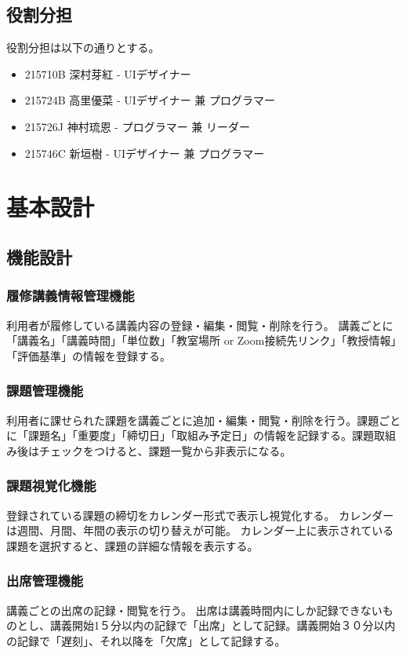 \documentclass[a4paper, 11pt, titlepage]{jsarticle}
\begin{document}
\subsection{役割分担}
役割分担は以下の通りとする。
\begin{itemize}
\item 215710B 深村芽紅 - UIデザイナー
\item 215724B 高里優菜 - UIデザイナー 兼 プログラマー
\item 215726J 神村琉恩 - プログラマー 兼 リーダー
\item 215746C 新垣樹 - UIデザイナー 兼 プログラマー
\end{itemize}

\clearpage

\section{基本設計}
\subsection{機能設計}
\subsubsection{履修講義情報管理機能}
利用者が履修している講義内容の登録・編集・閲覧・削除を行う。
講義ごとに「講義名」「講義時間」「単位数」「教室場所 or Zoom接続先リンク」「教授情報」「評価基準」の情報を登録する。
\subsubsection{課題管理機能}
利用者に課せられた課題を講義ごとに追加・編集・閲覧・削除を行う。課題ごとに「課題名」「重要度」「締切日」「取組み予定日」の情報を記録する。課題取組み後はチェックをつけると、課題一覧から非表示になる。
\subsubsection{課題視覚化機能}
登録されている課題の締切をカレンダー形式で表示し視覚化する。
カレンダーは週間、月間、年間の表示の切り替えが可能。
カレンダー上に表示されている課題を選択すると、課題の詳細な情報を表示する。
\subsubsection{出席管理機能}
講義ごとの出席の記録・閲覧を行う。
出席は講義時間内にしか記録できないものとし、講義開始1５分以内の記録で「出席」として記録。講義開始３０分以内の記録で「遅刻」、それ以降を「欠席」として記録する。
\end{document}
